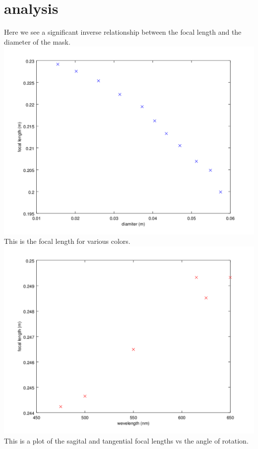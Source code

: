 \documentclass[12pt,a4paper]{article}
\begin{document}
\section{analysis}
Here we see a significant inverse relationship between the focal length and the diameter of the mask.\\
\includegraphics[scale=.7]{diamvsf}\\
This is the focal length for various colors.\\
\includegraphics[scale=.7]{wevevsf}\\
This is a plot of the sagital and tangential focal lengths vs the angle of rotation.\\
\end{document}
